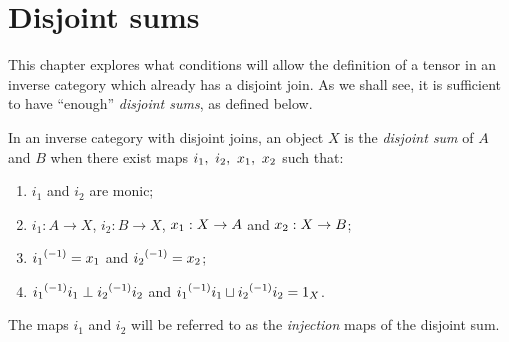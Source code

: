 \section{Disjoint sums} %
\label{sub:disjoint_sums}

This chapter explores what conditions will allow the definition of a  tensor in an inverse category
which already has a disjoint join. As we shall see, it is sufficient to have ``enough''
\emph{disjoint sums}, as defined below.

\begin{definition}\label{def:disjoint_sum}
  In an inverse category with disjoint joins, an object $X$ is the \emph{disjoint sum} of $A$ and
  $B$ when there exist maps $i_1,\ i_2,\ \xa,\ \xb$ such that:
  \begin{enumerate}[{(}i{)}]
    \item $i_1$ and $i_2$ are monic;
    \item $i_1 : A \to X$, $i_2: B \to X$, $x_1: X \to A$ and $x_2: X \to B$;
    \item ${i_1}^{(-1)} = x_1$ and ${i_2}^{(-1)} = x_2$;
    \item ${i_1}^{(-1)}i_1 \perp {i_2}^{(-1)}i_2$ and ${i_1}^{(-1)}i_1 \sqcup {i_2}^{(-1)}i_2 = 1_X$.
  \end{enumerate}
  The maps $i_1$ and $i_2$ will be referred to as the \emph{injection} maps of the disjoint sum.
\end{definition}

